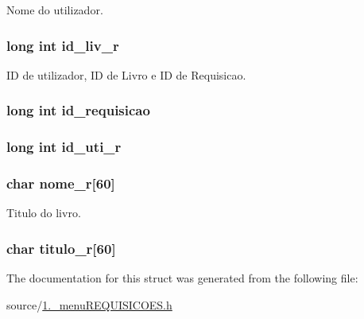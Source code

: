 Nome do utilizador. 

\hypertarget{structrequisicao_af636ce6e374d3e55eeb00565c29faf01}{
\subsubsection[{id\+\_\+liv\+\_\+r}]{\setlength{\rightskip}{0pt plus 5cm}long int id\+\_\+liv\+\_\+r}}\label{structrequisicao_af636ce6e374d3e55eeb00565c29faf01}


I\+D de utilizador, I\+D de Livro e I\+D de Requisicao. 

\hypertarget{structrequisicao_a83bcbbb52167d11b977097b6e3c282c9}{
\subsubsection[{id\+\_\+requisicao}]{\setlength{\rightskip}{0pt plus 5cm}long int id\+\_\+requisicao}}\label{structrequisicao_a83bcbbb52167d11b977097b6e3c282c9}
\hypertarget{structrequisicao_a46ba42e509577cf7ad9429d2293ff577}{
\subsubsection[{id\+\_\+uti\+\_\+r}]{\setlength{\rightskip}{0pt plus 5cm}long int id\+\_\+uti\+\_\+r}}\label{structrequisicao_a46ba42e509577cf7ad9429d2293ff577}
\hypertarget{structrequisicao_a1c7ba6d3e1e3e317652826e28fd517aa}{
\subsubsection[{nome\+\_\+r}]{\setlength{\rightskip}{0pt plus 5cm}char nome\+\_\+r\mbox{[}60\mbox{]}}}\label{structrequisicao_a1c7ba6d3e1e3e317652826e28fd517aa}


Titulo do livro. 

\hypertarget{structrequisicao_aa943485cb21e39e8c25250f36453db59}{
\subsubsection[{titulo\+\_\+r}]{\setlength{\rightskip}{0pt plus 5cm}char titulo\+\_\+r\mbox{[}60\mbox{]}}}\label{structrequisicao_aa943485cb21e39e8c25250f36453db59}


The documentation for this struct was generated from the following file\+:\begin{DoxyCompactItemize}
\item 
source/\hyperlink{1_83__menu_r_e_q_u_i_s_i_c_o_e_s_8h}{1.\+\_\+menu\+R\+E\+Q\+U\+I\+S\+I\+C\+O\+E\+S.\+h}\end{DoxyCompactItemize}
